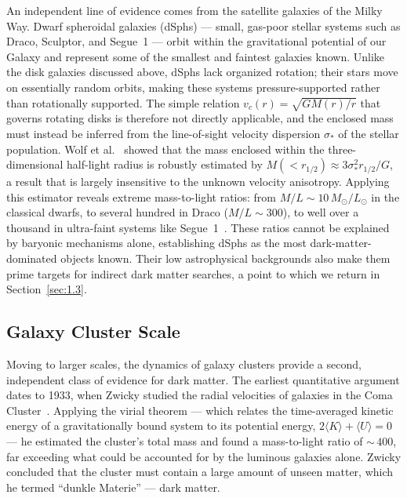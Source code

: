 An independent line of evidence comes from the satellite galaxies of the Milky Way.
Dwarf spheroidal galaxies (dSphs) --- small, gas-poor stellar systems such as Draco, Sculptor, and Segue~1 --- orbit within the gravitational potential of our Galaxy and represent some of the smallest and faintest galaxies known.
Unlike the disk galaxies discussed above, dSphs lack organized rotation; their stars move on essentially random orbits, making these systems pressure-supported rather than rotationally supported.
The simple relation $v_c(r) = \sqrt{GM(r)/r}$ that governs rotating disks is therefore not directly applicable, and the enclosed mass must instead be inferred from the line-of-sight velocity dispersion $\sigma_*$ of the stellar population.
Wolf et al.~\cite{Wolf:2009tu} showed that the mass enclosed within the three-dimensional half-light radius is robustly estimated by $M(<r_{1/2}) \approx 3\sigma_*^2 r_{1/2} / G$, a result that is largely insensitive to the unknown velocity anisotropy.
Applying this estimator reveals extreme mass-to-light ratios: from $M/L \sim 10\,M_\odot/L_\odot$ in the classical dwarfs, to several hundred in Draco ($M/L \sim 300$), to well over a thousand in ultra-faint systems like Segue~1~\cite{Walker:2009zp,Wolf:2009tu,Cirelli:2024ssz}.
These ratios cannot be explained by baryonic mechanisms alone, establishing dSphs as the most dark-matter-dominated objects known.
Their low astrophysical backgrounds also make them prime targets for indirect dark matter searches, a point to which we return in Section~\ref{sec:1.3}.

\subsection{Galaxy Cluster Scale}
\label{sec:1.1.2}

Moving to larger scales, the dynamics of galaxy clusters provide a second, independent class of evidence for dark matter.
The earliest quantitative argument dates to 1933, when Zwicky studied the radial velocities of galaxies in the Coma Cluster~\cite{Zwicky:1933}.
Applying the virial theorem --- which relates the time-averaged kinetic energy of a gravitationally bound system to its potential energy, $2\langle K \rangle + \langle U \rangle = 0$ --- he estimated the cluster's total mass and found a mass-to-light ratio of ${\sim}\,400$, far exceeding what could be accounted for by the luminous galaxies alone.
Zwicky concluded that the cluster must contain a large amount of unseen matter, which he termed ``dunkle Materie'' --- dark matter.

